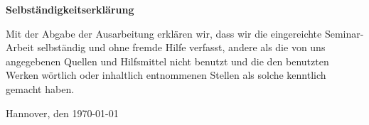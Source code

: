 \documentclass[12pt,DIV=14, version=first, BCOR=10mm,a4paper,twoside,parskip=half-,headsepline,headinclude]{scrreprt}
\begin{document}
\vfill

\begin{center} \sffamily\bfseries Selbständigkeitserklärung \end{center}

Mit der Abgabe der Ausarbeitung erklären wir, dass wir die eingereichte Seminar-Arbeit
selbständig und ohne fremde Hilfe verfasst, andere als die von uns angegebenen Quellen
und Hilfsmittel nicht benutzt und die den benutzten Werken wörtlich oder
inhaltlich entnommenen Stellen als solche kenntlich gemacht haben. 
\vspace*{7ex}

Hannover, den \today \hfill 

\pagebreak



\pagebreak









\end{document}
